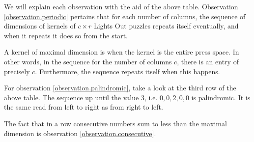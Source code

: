 We will explain each observation with the aid of the above table.
Observation \ref{observation.periodic} pertains that for each number of columns, the sequence of dimensions of kernels
of $c\times r$ Lights Out puzzles repeats itself eventually, and when it repeats it does so from the start.

A kernel of maximal dimension is when the kernel is the entire press space. In other words, in the sequence for the number of columns $c$,
there is an entry of precisely $c$. Furthermore, the sequence repeats itself when this happens.

For observation \ref{observation.palindromic}, take a look at the third row of the above table. The sequence up until the value 3, i.e. $0, 0, 2, 0, 0$ is palindromic.
It is the same read from left to right as from right to left.

The fact that in a row consecutive numbers sum to less than the maximal dimension is observation \ref{observation.consecutive}.



